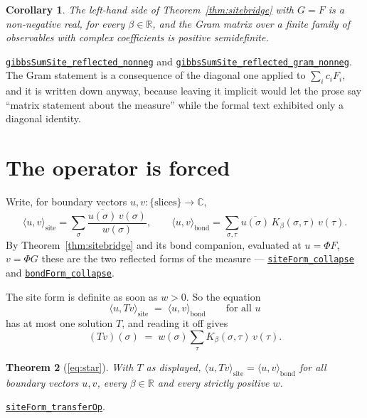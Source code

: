 \documentclass[11pt]{article}
\newtheorem{theorem}{Theorem}[section]
\newtheorem{corollary}[theorem]{Corollary}
\theoremstyle{definition}
\newcommand{\anchor}{c90dc745ab8cd1ba7ddc02aa16fed3de339bf958}
\newcommand{\osline}[3]{%
  \href{https://github.com/lluiseriksson/THE-ERIKSSON-PROGRAMME/blob/\anchor/YangMills/OS/#1.lean\#L#2}{\nolinkurl{#3}}}
\newcommand{\R}{\mathbb{R}}
\newcommand{\C}{\mathbb{C}}
\begin{document}
\begin{corollary}\label{cor:sitepos}
The left-hand side of Theorem~\ref{thm:sitebridge} with $G=F$ is a non-negative
real, for every $\beta\in\R$, and the Gram matrix over a finite family of
observables with complex coefficients is positive semidefinite.
\end{corollary}

\osline{SpatialOS}{1128}{gibbsSumSite\_reflected\_nonneg} and
\osline{SpatialOS}{1141}{gibbsSumSite\_reflected\_gram\_nonneg}.  The
Gram statement is a consequence of the diagonal one applied to
$\sum_i c_iF_i$, and it is written down anyway, because leaving it implicit
would let the prose say ``matrix statement about the measure'' while the formal
text exhibited only a diagonal identity.

\section{The operator is forced}\label{sec:forced}

Write, for boundary vectors $u,v:\{\text{slices}\}\to\C$,
\[
  \langle u,v\rangle_{\mathrm{site}}=\sum_\sigma
    \frac{\overline{u(\sigma)}\,v(\sigma)}{w(\sigma)},
  \qquad
  \langle u,v\rangle_{\mathrm{bond}}=\sum_{\sigma,\tau}
    \overline{u(\sigma)}\,K_\beta(\sigma,\tau)\,v(\tau).
\]
By Theorem~\ref{thm:sitebridge} and its bond companion, evaluated at
$u=\Phi F$, $v=\Phi G$ these are the two reflected forms of the measure ---
\osline{SpatialReconstruction}{91}{siteForm\_collapse} and
\osline{SpatialReconstruction}{98}{bondForm\_collapse}.

The site form is definite as soon as $w>0$.  So the equation
\begin{equation}\label{eq:star}
  \langle u,Tv\rangle_{\mathrm{site}}\;=\;\langle u,v\rangle_{\mathrm{bond}}
  \qquad\text{for all }u
  \tag{$*$}
\end{equation}
has at most one solution $T$, and reading it off gives
\[
  (Tv)(\sigma)\;=\;w(\sigma)\sum_\tau K_\beta(\sigma,\tau)\,v(\tau).
\]

\begin{theorem}[\eqref{eq:star}]\label{thm:star}
With $T$ as displayed, $\langle u,Tv\rangle_{\mathrm{site}}
=\langle u,v\rangle_{\mathrm{bond}}$ for all boundary vectors $u,v$, every
$\beta\in\R$ and every strictly positive $w$.
\end{theorem}

\osline{SpatialReconstruction}{116}{siteForm\_transferOp}.
\end{document}
